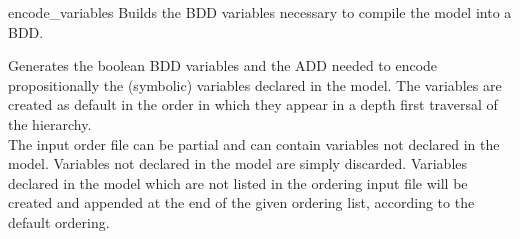 \begin{nusmvCommand} {encode\_variables} {Builds the BDD variables
    necessary to compile the model into a BDD.}


Generates the boolean BDD variables and the ADD needed to encode
propositionally the (symbolic) variables declared in the model. The
variables are created as default in the order in which they appear in
a depth first traversal of the hierarchy.\\The input order file can be
partial and can contain variables not declared in the model. Variables
not declared in the model are simply discarded. Variables declared in
the model which are not listed in the ordering input file will be
created and appended at the end of the given ordering list, according
to the default ordering.

\begin{cmdOpt}
\end{cmdOpt}
\end{nusmvCommand}
